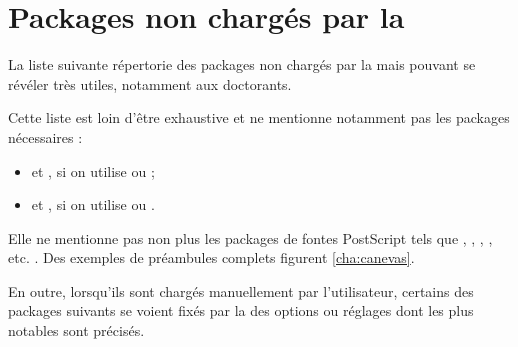 \section{Packages non chargés par la \yatcl{}}

La liste suivante répertorie des packages non chargés par la \yatcl{} mais
pouvant se révéler très utiles, notamment aux doctorants.

Cette liste est loin d'être exhaustive et ne mentionne notamment pas les
packages nécessaires :
\begin{itemize}
\item {} et , si on utilise  ou
   ;
\item {} et , si on utilise 
  ou .
\end{itemize}
Elle ne mentionne pas non plus les packages de fontes PostScript tels que
, , , ,
etc. . Des exemples de préambules complets figurent
\vref{cha:canevas}.

En outre, lorsqu'ils sont chargés manuellement par l'utilisateur, certains des
packages suivants se voient fixés par la \yatcl{} des options ou réglages dont
les plus notables sont précisés.

